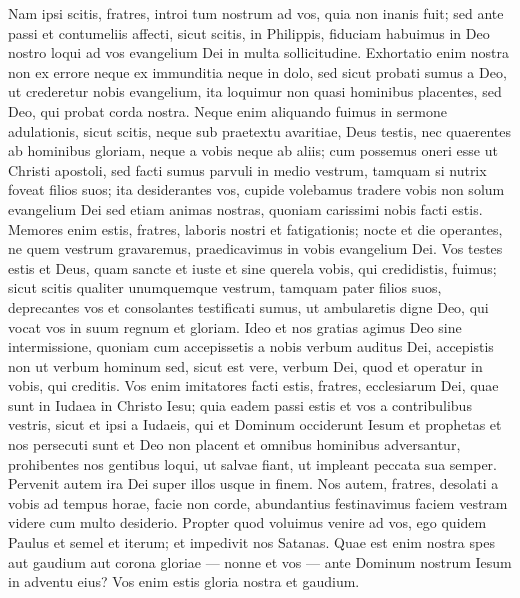 \begin{biblechapter}  
\verse Nam ipsi scitis, fratres, introi tum nostrum ad vos, quia non inanis fuit; 
\verse sed ante passi et contumeliis affecti, sicut scitis, in Philippis, fiduciam habuimus in Deo nostro loqui ad vos evangelium Dei in multa sollicitudine. 
\verse Exhortatio enim nostra non ex errore neque ex immunditia neque in dolo, 
\verse sed sicut probati sumus a Deo, ut crederetur nobis evangelium, ita loquimur non quasi hominibus placentes, sed Deo, qui probat corda nostra. 
\verse Neque enim aliquando fuimus in sermone adulationis, sicut scitis, neque sub praetextu avaritiae, Deus testis, 
\verse nec quaerentes ab hominibus gloriam, neque a vobis neque ab aliis; 
\verse cum possemus oneri esse ut Christi apostoli, sed facti sumus parvuli in medio vestrum, tamquam si nutrix foveat filios suos; 
\verse ita desiderantes vos, cupide volebamus tradere vobis non solum evangelium Dei sed etiam animas nostras, quoniam carissimi nobis facti estis. 
\verse Memores enim estis, fratres, laboris nostri et fatigationis; nocte et die operantes, ne quem vestrum gravaremus, praedicavimus in vobis evangelium Dei. 
\verse Vos testes estis et Deus, quam sancte et iuste et sine querela vobis, qui credidistis, fuimus; 
\verse sicut scitis qualiter unumquemque vestrum, tamquam pater filios suos, 
\verse deprecantes vos et consolantes testificati sumus, ut ambularetis digne Deo, qui vocat vos in suum regnum et gloriam. 
\verse Ideo et nos gratias agimus Deo sine intermissione, quoniam cum accepissetis a nobis verbum auditus Dei, accepistis non ut verbum hominum sed, sicut est vere, verbum Dei, quod et operatur in vobis, qui creditis. 
\verse Vos enim imitatores facti estis, fratres, ecclesiarum Dei, quae sunt in Iudaea in Christo Iesu; quia eadem passi estis et vos a contribulibus vestris, sicut et ipsi a Iudaeis,  
\verse qui et Dominum occiderunt Iesum et prophetas et nos persecuti sunt et Deo non placent et omnibus hominibus adversantur, 
\verse prohibentes nos gentibus loqui, ut salvae fiant, ut impleant peccata sua semper. Pervenit autem ira Dei super illos usque in finem. 
\verse Nos autem, fratres, desolati a vobis ad tempus horae, facie non corde, abundantius festinavimus faciem vestram videre cum multo desiderio. 
\verse Propter quod voluimus venire ad vos, ego quidem Paulus et semel et iterum; et impedivit nos Satanas. 
\verse Quae est enim nostra spes aut gaudium aut corona gloriae — nonne et vos — ante Dominum nostrum Iesum in adventu eius? 
\verse Vos enim estis gloria nostra et gaudium. 
\end{biblechapter}

